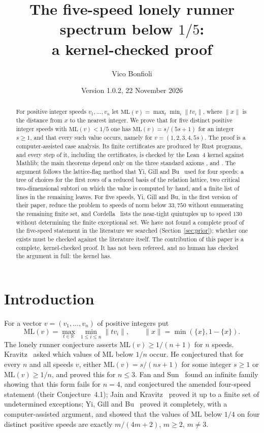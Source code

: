 \documentclass[11pt]{article}
\title{The five-speed lonely runner spectrum below $1/5$:\\ a kernel-checked proof}
\author{Vico Bonfioli}
\date{Version 1.0.2, 22 November 2026}
\theoremstyle{remark}
\newcommand{\ML}{\mathrm{ML}}
\newcommand{\R}{\mathbb{R}}
\newcommand{\dist}[1]{\lVert #1\rVert}
\begin{document}
\maketitle

\begin{abstract}
For positive integer speeds $v_1,\dots,v_n$ let $\ML(v)=\max_{t}\min_i\dist{tv_i}$, where $\dist{x}$ is the distance from $x$ to the nearest integer. We prove that for five distinct positive integer speeds with $\ML(v)<1/5$ one has $\ML(v)=s/(5s+1)$ for an integer $s\ge1$, and that every such value occurs, namely for $v=(1,2,3,4,5s)$. The proof is a computer-assisted case analysis. Its finite certificates are produced by Rust programs, and every step of it, including the certificates, is checked by the Lean~4 kernel against Mathlib; the main theorems depend only on the three standard axioms ,  and . The argument follows the lattice-flag method that Yi, Gill and Bu~\cite{YGB} used for four speeds: a tree of choices for the first rows of a reduced basis of the relation lattice, two critical two-dimensional subtori on which the value is computed by hand, and a finite list of lines in the remaining leaves. For five speeds, Yi, Gill and Bu, in the first version of their paper, reduce the problem to speeds of norm below $33{,}750$ without enumerating the remaining finite set, and Cordella~\cite{Cordella} lists the near-tight quintuples up to speed $130$ without determining the finite exceptional set. We have not found a complete proof of the five-speed statement in the literature we searched (Section~\ref{sec:prior}); whether one exists must be checked against the literature itself. The contribution of this paper is a complete, kernel-checked proof. It has not been refereed, and no human has checked the argument in full: the kernel has.
\end{abstract}

\section{Introduction}\label{sec:intro}

For a vector $v=(v_1,\dots,v_n)$ of positive integers put
\[
\ML(v)=\max_{t\in\R}\ \min_{1\le i\le n}\dist{tv_i},\qquad \dist{x}=\min(\{x\},1-\{x\}).
\]
The lonely runner conjecture asserts $\ML(v)\ge 1/(n+1)$ for $n$ speeds. Kravitz~\cite{Kravitz21} asked which values of $\ML$ below $1/n$ occur. He conjectured that for every $n$ and all speeds $v$, either $\ML(v)=s/(ns+1)$ for some integer $s\ge1$ or $\ML(v)\ge1/n$, and proved this for $n\le3$.
Fan and Sun~\cite{FanSun} found an infinite family showing that this form fails for $n=4$, and conjectured the amended four-speed statement (their Conjecture~4.1); Jain and Kravitz~\cite{JK} proved it up to a finite set of undetermined exceptions; Yi, Gill and Bu~\cite{YGB} proved it completely, with a computer-assisted argument, and showed that the values of $\ML$ below $1/4$ on four distinct positive speeds are exactly $m/(4m+2)$, $m\ge2$, $m\ne3$.
\end{document}
